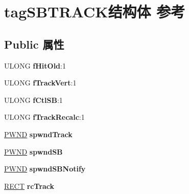 \hypertarget{structtag_s_b_t_r_a_c_k}{}\section{tag\+S\+B\+T\+R\+A\+C\+K结构体 参考}
\label{structtag_s_b_t_r_a_c_k}
\subsection*{Public 属性}
\begin{DoxyCompactItemize}
\item 
\mbox{\label{structtag_s_b_t_r_a_c_k_a02a476041120261f3cc5cbadc9c84c2f}} 
U\+L\+O\+NG {\bfseries f\+Hit\+Old}\+:1
\item 
\mbox{\label{structtag_s_b_t_r_a_c_k_a269a4e25b89db0cc1c5029d3673c23e0}} 
U\+L\+O\+NG {\bfseries f\+Track\+Vert}\+:1
\item 
\mbox{\label{structtag_s_b_t_r_a_c_k_af89384f4e26641780478451edf04f7b4}} 
U\+L\+O\+NG {\bfseries f\+Ctl\+SB}\+:1
\item 
\mbox{\label{structtag_s_b_t_r_a_c_k_a346c0d3f5def2a9ddc17815212aa253a}} 
U\+L\+O\+NG {\bfseries f\+Track\+Recalc}\+:1
\item 
\mbox{\label{structtag_s_b_t_r_a_c_k_af9733334f21a1c8e73e9ebb67f970d46}} 
\hyperlink{struct___w_n_d}{P\+W\+ND} {\bfseries spwnd\+Track}
\item 
\mbox{\label{structtag_s_b_t_r_a_c_k_ae5d01a9ade40cb7ca839c8506be2322f}} 
\hyperlink{struct___w_n_d}{P\+W\+ND} {\bfseries spwnd\+SB}
\item 
\mbox{\label{structtag_s_b_t_r_a_c_k_a1e88143e687db97cbb2fc0c95bfac2e6}} 
\hyperlink{struct___w_n_d}{P\+W\+ND} {\bfseries spwnd\+S\+B\+Notify}
\item 
\mbox{\label{structtag_s_b_t_r_a_c_k_a4305c64dab54280fa64089ef8a16e10d}} 
\hyperlink{structtag_r_e_c_t}{R\+E\+CT} {\bfseries rc\+Track}
\item 
\mbox{\label{structtag_s_b_t_r_a_c_k_a7e805097a43852a2cd825c384b96a6d3}} 

\end{DoxyCompactItemize}

